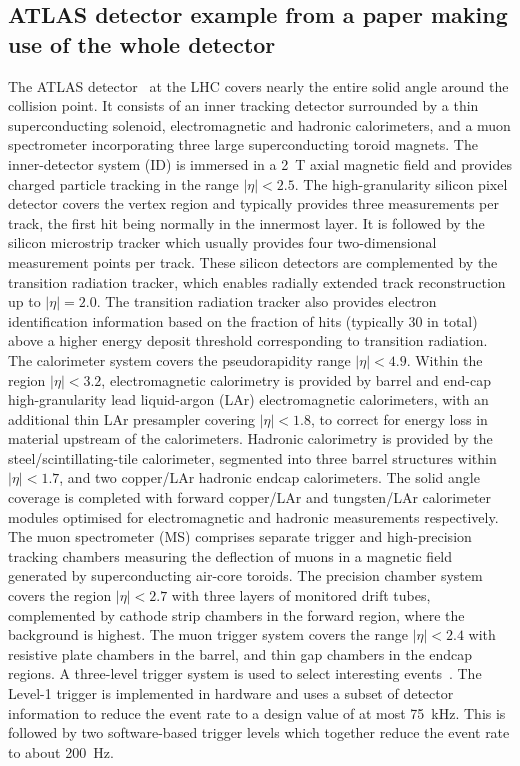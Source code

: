 \subsection{ATLAS detector example from a paper making use of the whole detector}
\label{sec:atlas2}

The ATLAS detector~\cite{atlas-detector} at the LHC covers nearly the entire solid angle around the collision point.
It consists of an inner tracking detector surrounded by a thin superconducting solenoid, electromagnetic and hadronic calorimeters, and a muon spectrometer incorporating three large superconducting toroid magnets.
The inner-detector system (ID) is immersed in a \SI{2}{\tesla} axial magnetic field 
and provides charged particle tracking in the range $|\eta| < 2.5$. 
The high-granularity silicon pixel detector covers the vertex region and typically provides three measurements per track, 
the first hit being normally in the innermost layer.
It is followed by the silicon microstrip tracker which usually provides four two-dimensional measurement points per track.
These silicon detectors are complemented by the transition radiation tracker,
which enables radially extended track reconstruction up to $|\eta| = 2.0$. 
The transition radiation tracker also provides electron identification information 
based on the fraction of hits (typically 30 in total) above a higher energy deposit threshold corresponding to transition radiation.
The calorimeter system covers the pseudorapidity range $|\eta| < 4.9$.
Within the region $|\eta|< 3.2$, electromagnetic calorimetry is provided by barrel and 
end-cap high-granularity lead liquid-argon (LAr) electromagnetic calorimeters,
with an additional thin LAr presampler covering $|\eta| < 1.8$,
to correct for energy loss in material upstream of the calorimeters.
Hadronic calorimetry is provided by the steel/scintillating-tile calorimeter,
segmented into three barrel structures within $|\eta| < 1.7$, and two copper/LAr hadronic endcap calorimeters.
The solid angle coverage is completed with forward copper/LAr and tungsten/LAr calorimeter modules
optimised for electromagnetic and hadronic measurements respectively.
The muon spectrometer (MS) comprises separate trigger and
high-precision tracking chambers measuring the deflection of muons in a magnetic field generated by superconducting air-core toroids.
The precision chamber system covers the region $|\eta| < 2.7$ with three layers of monitored drift tubes,
complemented by cathode strip chambers in the forward region, where the background is highest.
The muon trigger system covers the range $|\eta| < 2.4$ with resistive plate chambers in the barrel, and thin gap chambers in the endcap regions.
A three-level trigger system is used to select interesting events~\cite{atlas-trigger-2010}.
The Level-1 trigger is implemented in hardware and uses a subset of detector information
to reduce the event rate to a design value of at most \SI{75}{\kHz}.
This is followed by two software-based trigger levels which together reduce the event rate to about 200~Hz.

